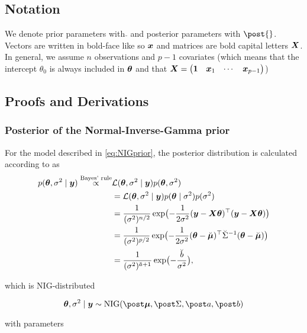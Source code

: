 \subsection*{Notation}

We denote prior parameters with $\breve{}$ and posterior parameters with $\post{}$. Vectors are written in bold-face like so $\bm{x}$ and matrices are bold capital letters $\bm{X}$. In general, we assume $n$ observations and $p-1$ covariates (which means that the intercept $\theta_0$ is always included in $\bm{\theta}$ and that $\bm{X} = \begin{pmatrix}
    \bm{1} & \bm{x}_1 & \cdots & \bm{x}_{p-1}
\end{pmatrix}$)


\subsection*{Proofs and Derivations}

\subsubsection*{Posterior of the Normal-Inverse-Gamma prior}
For the model described in \eqref{eq:NIGprior}, the posterior distribution is calculated according to \citet{fahrmeir_regression_2021} as
\begin{equation*}
    \begin{aligned}
        p(\bm{\theta}, \sigma^2 \mid \bm{y}) \overset{\text{Bayes' rule}}{\propto}& \mathcal{L}(\bm{\theta}, \sigma^2 \mid \bm{y}) p(\bm{\theta}, \sigma^2) \\
        &= \mathcal{L}(\bm{\theta}, \sigma^2 \mid \bm{y}) p(\bm{\theta} \mid \sigma^2) p(\sigma^2) \\
        &= \frac{1}{(\sigma^2)^{n/2}} \exp\bigl( - \frac{1}{2\sigma^2} (\bm{y} - \bm{X} \bm{\theta})^\top(\bm{y} - \bm{X} \bm{\theta}) \bigr)\\
        &= \frac{1}{(\sigma^2)^{p/2}} \exp\bigl( - \frac{1}{2\sigma^2} (\bm{\theta} - \breve{\bm{\mu}})^\top \breve{\Sigma}^{-1} (\bm{\theta} - \breve{\bm{\mu}}) \bigr)\\
        &= \frac{1}{(\sigma^2)^{\breve{a} + 1}} \exp\bigl( - \frac{\breve{b}}{\sigma^2} \bigr),
    \end{aligned}
\end{equation*}

which is NIG-distributed

\begin{equation*}
    \btheta, \ssd \mid \by \sim \text{NIG}(\mupo, \Sdpo, \apo, \bpo)
\end{equation*}

with parameters

